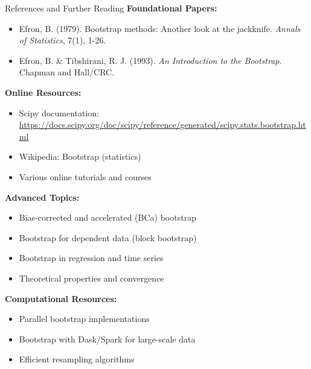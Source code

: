 \documentclass[aspectratio=169]{beamer}
\begin{document}
\begin{frame}{References and Further Reading}
\scriptsize
\textbf{Foundational Papers:}
\begin{itemize}
    \item Efron, B. (1979). Bootstrap methods: Another look at the jackknife. \textit{Annals of Statistics}, 7(1), 1-26.
    \item Efron, B. \& Tibshirani, R. J. (1993). \textit{An Introduction to the Bootstrap}. Chapman and Hall/CRC.
\end{itemize}

\vspace{0.1cm}
\textbf{Online Resources:}
\begin{itemize}
    \item Scipy documentation: \url{https://docs.scipy.org/doc/scipy/reference/generated/scipy.stats.bootstrap.html}
    \item Wikipedia: Bootstrap (statistics)
    \item Various online tutorials and courses
\end{itemize}

\vspace{0.1cm}
\textbf{Advanced Topics:}
\begin{itemize}
    \item Bias-corrected and accelerated (BCa) bootstrap
    \item Bootstrap for dependent data (block bootstrap)
    \item Bootstrap in regression and time series
    \item Theoretical properties and convergence
\end{itemize}

\vspace{0.1cm}
\textbf{Computational Resources:}
\begin{itemize}
    \item Parallel bootstrap implementations
    \item Bootstrap with Dask/Spark for large-scale data
    \item Efficient resampling algorithms
\end{itemize}
\end{frame}
\end{document}
